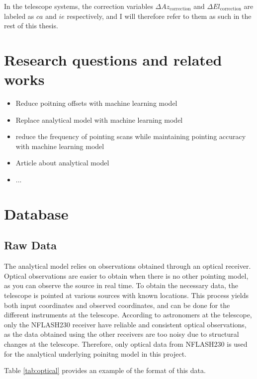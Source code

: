 In the telescope systems, the correction variables $\Delta Az_\text{correction}$ and $\Delta El_\text{correction}$ are labeled as $ca$ and $ie$ respectively,
and I will therefore refer to them as such in the rest of this thesis.

\section{Research questions and related works}
\begin{itemize}
    \item Reduce poitning offsets with machine learning model
    \item Replace analytical model with machine learning model
    \item reduce the frequency of pointing scans while maintaining pointing accuracy with machine learning model
\end{itemize}

\begin{itemize}
    \item Article about analytical model
    \item ...
\end{itemize}

\section{Database}


\subsection{Raw Data}
The analytical model relies on observations obtained through an optical receiver.
Optical observations are easier to obtain when there is no other pointing model, as you can observe the source in real time.
To obtain the necessary data, the telescope is pointed at various sources with known locations.
This process yields both input coordinates and observed coordinates, and can be done for the different instruments at the telescope.
According to astronomers at the telescope, only the NFLASH230 receiver have reliable and consistent optical observations, as the data obtained using the other receivers
are too noisy due to structural changes at the telescope. Therefore, only optical data from NFLASH230 is used for the analytical underlying poinitng model in this project.

Table \ref{tab:optical} provides an example of the format of this data.
    

